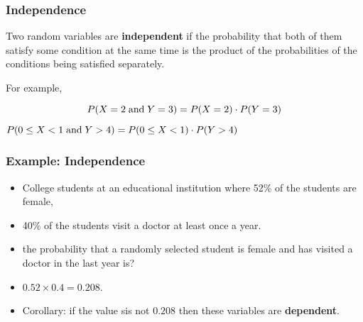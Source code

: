 %
%
%
%
%
%
%
%

\begin{frame}
\frametitle{Independence}

Two random variables are {\bf independent} if the probability that
both of them satisfy some condition at the same time is the product of
the probabilities of the conditions being satisfied separately.

For example,

$$
P(X=2\;{\rm and}\;Y=3) = P(X=2)\cdot P(Y=3)
$$

\begin{center}
$P(0\le X<1\;{\rm and}\;Y>4) = P(0 \le X < 1)\cdot P(Y>4)$ 
\end{center}

\end{frame}

\begin{frame}
\frametitle{Example: Independence}

\begin{itemize}
\item College students at an educational institution where 52\% of the
students are female,
\item 40\% of the students visit a doctor at
least once a year.

\item the probability
that a randomly selected student is female and has visited a doctor in
the last year is?

\item  $0.52\times 0.4 = 0.208$.

\item Corollary: if the value sis not $0.208$ then these variables
are {\bf dependent}.
\end{itemize}
\end{frame}

